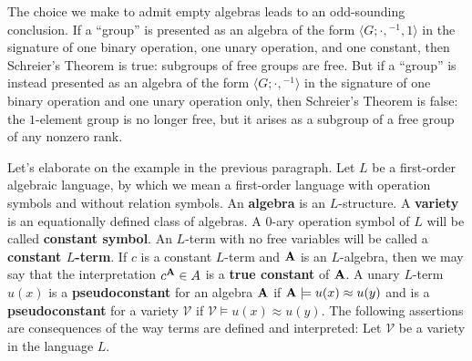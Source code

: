 \documentclass[12pt]{amsart}
\theoremstyle{definition}
\numberwithin{equation}{section}
\newcommand{\m}[1]{{\mathbf{\uppercase{#1}}}}
\begin{document}
The choice we make to admit empty algebras
leads to an odd-sounding conclusion.
If a ``group'' is presented as an
algebra of the form $\langle G; \cdot, {}^{-1},1\rangle$
in the signature of one binary operation,
one unary operation, and one constant, then
Schreier's Theorem is true: subgroups of free groups
are free. But if a ``group'' is instead presented as an 
algebra of the form $\langle G; \cdot, {}^{-1}\rangle$
in the signature of one binary operation and
one unary operation only, then
Schreier's Theorem is false: the $1$-element
group is no longer free, but it arises as a subgroup
of a free group of any nonzero rank.

Let's elaborate on the example in the previous paragraph.
Let $L$ be a first-order algebraic language, 
by which we mean a first-order language with
operation symbols and without relation symbols.
An \textbf{algebra} is an $L$-structure.
A \textbf{variety} is an equationally defined
class of algebras.
A $0$-ary operation symbol of $L$ will be called
\textbf{constant symbol}.
An $L$-term with no free variables will be called 
a \textbf{constant $L$-term}.
If $c$ is a constant $L$-term and $\m a$
is an $L$-algebra, then we may say that
the interpretation $c^{\m a}\in A$ is a \textbf{true constant}
of $\m a$.
A unary $L$-term $u(x)$ is a \textbf{pseudoconstant}
for an algebra $\m a$ if $\m a\models u(x)\approx u(y)$
and is a \textbf{pseudoconstant}
for a variety $\mathcal V$ if ${\mathcal V}\models u(x)\approx u(y)$.
The following assertions are consequences
of the way terms are defined and interpreted:
Let $\mathcal V$ be a variety in the language $L$.
\end{document}
